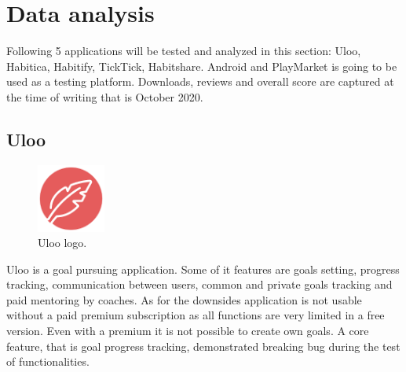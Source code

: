 \section{Data analysis}\label{sec:data-analysis}

Following 5 applications will be tested and analyzed in this section: Uloo, Habitica, Habitify, TickTick, Habitshare.
Android and PlayMarket is going to be used as a testing platform.
Downloads, reviews and overall score are captured at the time of writing that is October 2020.

\subsection{Uloo}\label{subsec:uloo}

\begin{figure}[h!]
    \includegraphics[width=0.20\textwidth]{images/uloo-logo.png}
    \caption{Uloo logo.\cite{uloo-logo}}
    \label{fig:uloo-logo}
\end{figure}

Uloo is a goal pursuing application.
Some of it features are goals setting, progress tracking, communication between users, common and private goals tracking and paid mentoring by coaches.
As for the downsides application is not usable without a paid premium subscription as all functions are very limited in a free version.
Even with a premium it is not possible to create own goals.
A core feature, that is goal progress tracking, demonstrated breaking bug during the test of functionalities.

